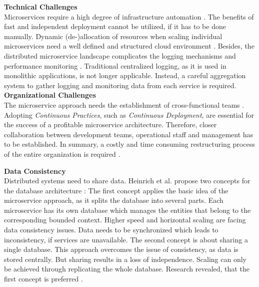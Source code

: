 \noindent
\textbf{Technical Challenges}\\
Microservices require a high degree of infrastructure automation \cite{MigratingTowardsSurvey}. The benefits of fast and independent deployment cannot be utilized, if it has to be done manually. Dynamic (de-)allocation of resources when scaling individual microservices need a well defined and structured cloud environment \cite{MigratingCloud}. 
Besides, the distributed microservice landscape complicates the logging mechanisms and performance monitoring \cite{SystematicMappingStudyMicroservice}. Traditional centralized logging, as it is used in monolithic applications, is not longer applicable. Instead, a careful aggregation system to gather logging and monitoring data from each service is required.\\

\noindent
\textbf{Organizational Challenges}\\
The microservice approach needs the establishment of cross-functional teams \cite{Fowler}. Adopting \textit{Continuous Practices}, such as \textit{Continuous Deployment}, are essential for the success of a profitable microservice architecture. Therefore, closer collaboration between development teams, operational staff and management has to be established. In summary, a costly and time consuming restructuring process of the entire organization is required \cite{NikoProseminar}. \\

\pagebreak

\noindent
\textbf{Data Consistency}\\
Distributed systems need to share data. Heinrich et al. propose two concepts for the database architecture \cite{FunctionalDecompositionHeinrich}: The first concept applies the basic idea of the microservice approach, as it splits the database into several parts. Each microservice has its own database which manages the entities that belong to the corresponding bounded context. Higher speed and horizontal scaling are facing data consistency issues. Data needs to be synchronized which leads to inconsistency, if services are unavailable. The second concept is about sharing a single database. This approach overcomes the issue of consistency, as data is stored centrally. But sharing results in a loss of independence. Scaling can only be achieved through replicating the whole database. Research revealed, that the first concept is preferred \cite{FunctionalDecompositionHeinrich}. \\



